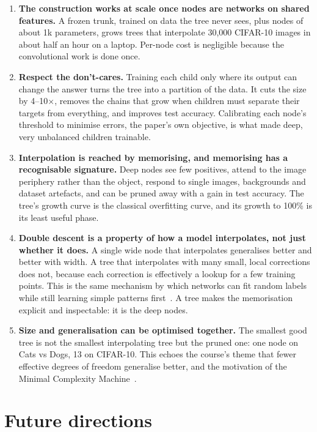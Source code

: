 \documentclass[10.5pt,a4paper]{article}
\begin{document}
\begin{enumerate}[(1)]
\item \textbf{The construction works at scale once nodes are networks on shared features.} A frozen trunk, trained on
data the tree never sees, plus nodes of about 1k parameters, grows trees that interpolate 30{,}000 CIFAR-10 images in
about half an hour on a laptop. Per-node cost is negligible because the convolutional work is done once.
\item \textbf{Respect the don't-cares.} Training each child only where its output can change the answer turns the tree
into a partition of the data. It cuts the size by 4--10$\times$, removes the chains that grow when children must
separate their targets from everything, and improves test accuracy. Calibrating each node's threshold to minimise
errors, the paper's own objective, is what made deep, very unbalanced children trainable.
\item \textbf{Interpolation is reached by memorising, and memorising has a recognisable signature.} Deep nodes see
few positives, attend to the image periphery rather than the object, respond to single images, backgrounds and
dataset artefacts, and can be pruned away with a gain in test accuracy. The tree's growth curve is the classical
overfitting curve, and its growth to 100\% is its least useful phase.
\item \textbf{Double descent is a property of how a model interpolates, not just whether it does.} A single wide node
that interpolates generalises better and better with width. A tree that interpolates with many small, local
corrections does not, because each correction is effectively a lookup for a few training points. This is the same
mechanism by which networks can fit random labels~\cite{zhang2017understanding} while still learning simple patterns
first~\cite{arpit2017closer}. A tree makes the memorisation explicit and inspectable: it is the deep nodes.
\item \textbf{Size and generalisation can be optimised together.} The smallest good tree is not the smallest
interpolating tree but the pruned one: one node on Cats vs Dogs, 13 on CIFAR-10. This echoes the course's theme that
fewer effective degrees of freedom generalise better, and the motivation of the Minimal Complexity
Machine~\cite{jayadeva2015learning}.
\end{enumerate}

\section{Future directions}
\label{sec:future}
\end{document}
